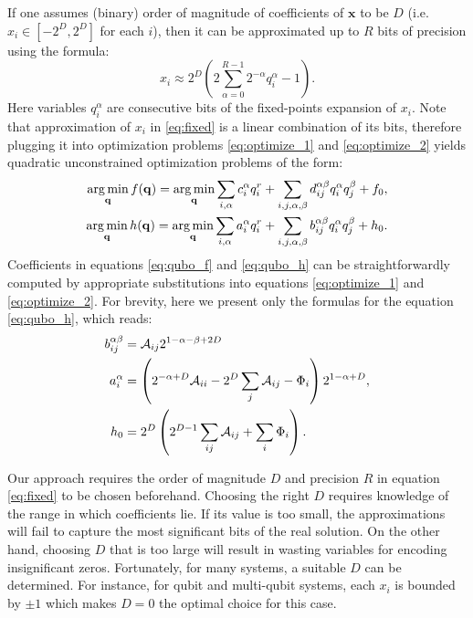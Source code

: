 If one assumes (binary) order of magnitude of coefficients of
$\mathbf x$ to be $D$ (i.e. $x_i \in [-2^D, 2^D]$ for each $i$), then it can be
approximated up to $R$ bits of precision using the formula:
\begin{equation}
  \label{eq:fixed}
  x_i \approx 2^D \left(2 \sum_{\alpha=0}^{R-1}2^{-\alpha}q_i^{\alpha} -1\right).
\end{equation}
Here variables $q_i^\alpha$ are consecutive bits of the fixed-points expansion
of $x_i$. Note that approximation of $x_i$ in \eqref{eq:fixed} is a linear
combination of its bits, therefore plugging it into optimization problems
\eqref{eq:optimize_1} and \eqref{eq:optimize_2} yields quadratic unconstrained
optimization problems of the form:
\begin{align}
  \label{eq:qubo_f}
  \operatorname*{arg\,min}_{\mathbf{q}} f(\mathbf{q}) = \operatorname*{arg\,min}_{\mathbf{q}} \sum_{i,\alpha} c_i^{\alpha} q_i^r + \sum_{i,j,\alpha,\beta} d_{ij}^{\alpha\beta} q_i^{\alpha} q_j^{\beta} + f_0, \\
  \label{eq:qubo_h}
  \operatorname*{arg\,min}_{\mathbf{q}} h(\mathbf{q}) = \operatorname*{arg\,min}_{\mathbf{q}} \sum_{i,\alpha} a_i^{\alpha} q_i^r + \sum_{i,j,\alpha,\beta} b_{ij}^{\alpha\beta} q_i^{\alpha} q_j^{\beta} + h_0.
\end{align}
Coefficients in equations \eqref{eq:qubo_f} and \eqref{eq:qubo_h} can be
straightforwardly computed by appropriate substitutions into equations
\eqref{eq:optimize_1} and \eqref{eq:optimize_2}. For brevity, here we present
only the formulas for the equation \eqref{eq:qubo_h}, which reads:
\begin{eqnarray}
  \begin{split}
    b_{ij}^{\alpha\beta} &= \mathcal{A}_{ij} 2^{1-\alpha-\beta+2D} \\
    a_i^\alpha &= \left( 2^{-\alpha+D}\mathcal{A}_{ii} - 2^D\sum_{j}\mathcal{A}_{ij}- \Phi_i\right)2^{1-\alpha+D},
    \\
    h_0 &= 2^D\left( 2^{D-1}\sum_{ij}\mathcal{A}_{ij}+\sum_i \Phi_i\right).
  \end{split}
  \label{eq:coeff}
\end{eqnarray}

Our approach requires the order of magnitude $D$ and precision $R$ in equation
\eqref{eq:fixed} to be chosen beforehand. Choosing the right $D$ requires
knowledge of the range in which coefficients lie. If its value is too small,
the approximations will fail to capture the most significant bits of the real
solution. On the other hand, choosing $D$ that is too large will result in
wasting variables for encoding insignificant zeros. Fortunately, for many
systems, a suitable $D$ can be determined. For instance, for qubit and
multi-qubit systems, each $x_i$ is bounded by $\pm 1$ which makes $D=0$ the
optimal choice for this case.

